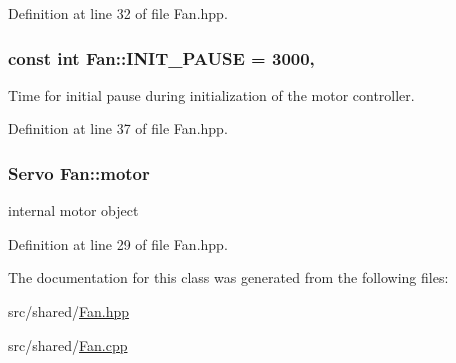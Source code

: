 Definition at line 32 of file Fan.\-hpp.

\hypertarget{classFan_a8d7eb0f5de190ffc2f5d0ae1c5c10e29}{
\subsubsection[{I\-N\-I\-T\-\_\-\-P\-A\-U\-S\-E}]{\setlength{\rightskip}{0pt plus 5cm}const int Fan\-::\-I\-N\-I\-T\-\_\-\-P\-A\-U\-S\-E = 3000\hspace{0.3cm}{\ttfamily [static]}, {\ttfamily [private]}}}\label{classFan_a8d7eb0f5de190ffc2f5d0ae1c5c10e29}


Time for initial pause during initialization of the motor controller. 



Definition at line 37 of file Fan.\-hpp.

\hypertarget{classFan_aff9de16d110a96ff5788f7d6ad6ef715}{
\subsubsection[{motor}]{\setlength{\rightskip}{0pt plus 5cm}Servo Fan\-::motor\hspace{0.3cm}{\ttfamily [private]}}}\label{classFan_aff9de16d110a96ff5788f7d6ad6ef715}


internal motor object 



Definition at line 29 of file Fan.\-hpp.



The documentation for this class was generated from the following files\-:\begin{DoxyCompactItemize}
\item 
src/shared/\hyperlink{Fan_8hpp}{Fan.\-hpp}\item 
src/shared/\hyperlink{Fan_8cpp}{Fan.\-cpp}\end{DoxyCompactItemize}
